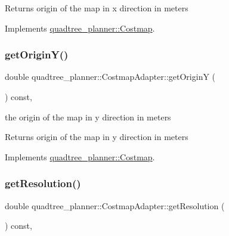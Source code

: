 \begin{DoxyReturn}{Returns}
origin of the map in x direction in meters 
\end{DoxyReturn}


Implements \hyperlink{classquadtree__planner_1_1Costmap_a8fda39ff20cf58f6700705dae7bd3a0b}{quadtree\+\_\+planner\+::\+Costmap}.

\mbox{\label{classquadtree__planner_1_1CostmapAdapter_a004ee5ebfac631b47f6d3987e933cd38}} 
\subsubsection{\texorpdfstring{get\+Origin\+Y()}{getOriginY()}}
{\footnotesize\ttfamily double quadtree\+\_\+planner\+::\+Costmap\+Adapter\+::get\+OriginY (\begin{DoxyParamCaption}{ }\end{DoxyParamCaption}) const\hspace{0.3cm}{\ttfamily [override]}, {\ttfamily [virtual]}}



the origin of the map in y direction in meters 

\begin{DoxyReturn}{Returns}
origin of the map in y direction in meters 
\end{DoxyReturn}


Implements \hyperlink{classquadtree__planner_1_1Costmap_aa2b342e257504329321109b1822ca302}{quadtree\+\_\+planner\+::\+Costmap}.

\mbox{\label{classquadtree__planner_1_1CostmapAdapter_abfe3febc6445cbbd2aa7379c8635539b}} 
\subsubsection{\texorpdfstring{get\+Resolution()}{getResolution()}}
{\footnotesize\ttfamily double quadtree\+\_\+planner\+::\+Costmap\+Adapter\+::get\+Resolution (\begin{DoxyParamCaption}{ }\end{DoxyParamCaption}) const\hspace{0.3cm}{\ttfamily [override]}, {\ttfamily [virtual]}}




